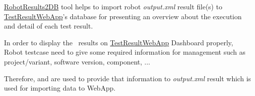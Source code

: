 



\href{https://github.com/test-fullautomation/robotframework-testresultwebapptool}{RobotResults2DB}
tool helps to import robot \emph{output.xml} result file(s) to
\href{https://github.com/test-fullautomation/testresultwebapp}{TestResultWebApp}'s
database for presenting an overview about the execution and detail of
each test result.

In order to display the \rfwcore\ results on
\href{https://github.com/test-fullautomation/testresultwebapp}{TestResultWebApp}
Dashboard properly, Robot testcase need to give some required
information for management such as project/variant, software version,
component, ...

Therefore,  and \rcode{[Tags]} are used to provide
that information to \emph{output.xml} result which is used for importing
data to WebApp.

